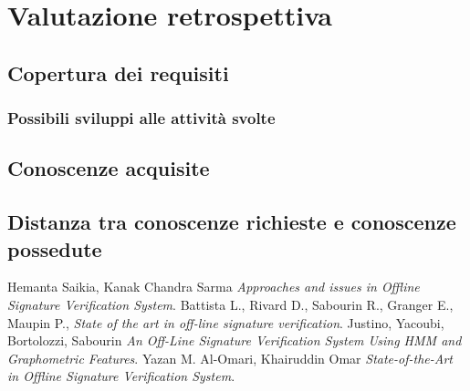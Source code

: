 \section{Valutazione retrospettiva}
\label{4.0}

\subsection{Copertura dei requisiti}
\label{4.1}

\subsubsection{Possibili sviluppi alle attività svolte}
\subsection{Conoscenze acquisite}

\label{4.2}
\subsection{Distanza tra conoscenze richieste e conoscenze possedute}

\label{4.3}
\newpage

\printglossaries
{}
\label{5.0}

\newpage
\begin{thebibliography}{1}
 Hemanta Saikia, Kanak Chandra Sarma {\em Approaches and issues in Offline Signature Verification System}.
 Battista L., Rivard D., Sabourin R., Granger E., Maupin P., {\em State of the art in off-line signature verification}.
 Justino, Yacoubi, Bortolozzi, Sabourin {\em An Off-Line Signature Verification System Using HMM and Graphometric Features}.
 Yazan M. Al-Omari, Khairuddin Omar {\em State-of-the-Art in Offline Signature Verification System}.
\end{thebibliography}
\label{6.0}

\newpage





